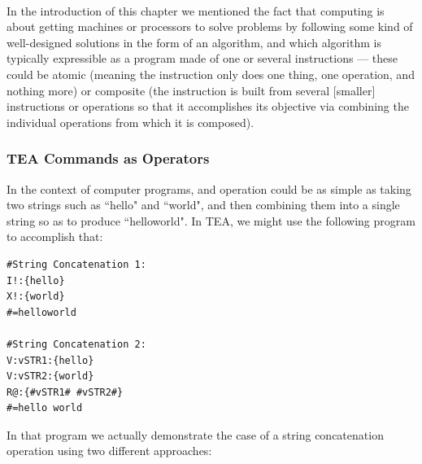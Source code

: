 \documentclass[a4paper, 18pt]{book} %
\begin{document}
{{{\begin{appendices}
\begin{center}
{\begin{minipage}{0.9\textwidth}
\end{minipage}}
\\
\end{center}

\vspace{2em}

In the introduction of this chapter we mentioned the fact that computing is about getting machines or processors to solve problems by following some kind of well-designed solutions in the form of an algorithm, and which algorithm is typically expressible as a program made of one or several instructions --- these could be atomic (meaning the instruction only does one thing, one operation, and nothing more) or composite (the instruction is built from several [smaller] instructions or operations so that it accomplishes its objective via combining the individual operations from which it is composed).

\subsubsection{TEA Commands as Operators}

In the context of computer programs, and operation could be as simple as taking two strings such as ``hello" and ``world", and then combining them into a single string so as to produce ``helloworld". In TEA, we might use the following program to accomplish that:


\vspace{2em}

  \begin{tcolorbox}[teaterminalstyle, title=TEA OPERATIONS: Example 1: Basic Operation: String Concatenation, breakable]
  \begin{lstlisting}[language=TEA,breaklines=true,]
#String Concatenation 1:
I!:{hello}
X!:{world}
#=helloworld

#String Concatenation 2:
V:vSTR1:{hello}
V:vSTR2:{world}
R@:{#vSTR1# #vSTR2#}
#=hello world
   \end{lstlisting}
  \end{tcolorbox}

\vspace{2em}


In that program we actually demonstrate the case of a string concatenation operation using two different approaches:


\end{appendices}}}}
\end{document}
